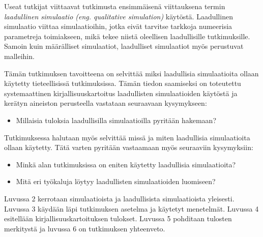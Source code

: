 \documentclass[utf8]{gradu3}
\begin{document}
Useat tutkijat viittaavat \textcite{kuipers1986qualitative} tutkimusta ensimmäisenä
viittauksena termin \textit{laadullinen simulaatio (eng. qualitative simulation)} 
käytöstä. Laadullinen simulaatio viittaa simulaatioihin, 
jotka eivät tarvitse tarkkoja numeerisia parametreja toimiakseen, 
mikä tekee niistä oleellisen laadullisille tutkimuksille. 
Samoin kuin määrälliset simulaatiot, laadulliset simulaatiot myös perustuvat malleihin.

Tämän tutkimuksen tavoitteena on selvittää miksi laadullisia simulaatioita 
ollaan käytetty tieteellisissä tutkimuksissa. Tämän tiedon saamiseksi on
toteutettu systemaattinen kirjallisuuskartoitus 
laadullisten simulaatioiden käytöstä ja kerätyn aineiston perusteella vastataan 
seuraavaan kysymykseen:
\begin{itemize}
    \item Millaisia tuloksia laadullisilla simulaatioilla pyritään hakemaan?
\end{itemize}

Tutkimuksessa halutaan myös selvittää missä ja miten laadullisia simulaatioita
ollaan käytetty. Tätä varten pyritään vastaamaan myös seuraaviin kysymyksiin:
\begin{itemize}
    \item Minkä alan tutkimuksissa on eniten käytetty laadullisia simulaatioita?
    \item Mitä eri työkaluja löytyy laadullisten simulaatioiden luomiseen?
\end{itemize}

Luvussa 2 kerrotaan simulaatioista ja laadullisista simulaatioista yleisesti. Luvussa 3 käydään läpi tutkimuksen asetelma ja käytetyt menetelmät. Luvussa 4 esitellään kirjallisuuskartoituksen tulokset. Luvussa 5 pohditaan tulosten merkitystä ja luvussa 6 on tutkimuksen yhteenveto.
\end{document}
